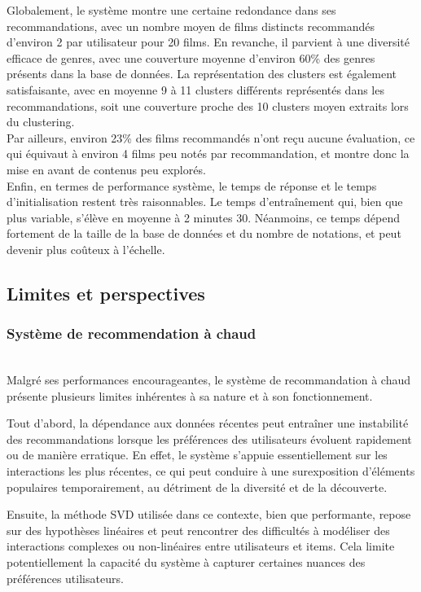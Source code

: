 \documentclass{article}
\begin{document}
Globalement, le système montre une certaine redondance dans ses recommandations, avec un nombre moyen de films distincts recommandés d’environ 2 par utilisateur pour 20 films. En revanche, il parvient à une
diversité efficace de genres, avec une couverture moyenne d’environ 60\% des genres présents dans la base de données.
La représentation des clusters est également satisfaisante, avec en moyenne 9 à 11 clusters différents représentés dans
les recommandations, soit une couverture proche des 10 clusters moyen extraits lors du clustering.\\
Par ailleurs, environ 23\% des films recommandés n’ont reçu aucune évaluation, ce qui équivaut à environ 4 films peu notés
par recommandation, et montre donc la mise en avant de contenus peu explorés.\\
Enfin, en termes de performance système, le temps de réponse et le temps d’initialisation restent très raisonnables. Le temps d’entraînement qui, bien que plus variable, s’élève en moyenne à 2 minutes 30.
 Néanmoins, ce temps dépend fortement de la taille de la base de données et du nombre de notations, et peut devenir plus coûteux à l’échelle.

\subsection{Limites et perspectives}
\subsubsection{Système de recommendation à chaud}
$ $\\
Malgré ses performances encourageantes, le système de recommandation à chaud présente plusieurs limites inhérentes à sa nature et à son fonctionnement.

Tout d’abord, la dépendance aux données récentes peut entraîner une instabilité des recommandations lorsque les préférences des utilisateurs évoluent rapidement ou de manière erratique. En effet, le système s’appuie essentiellement sur les interactions les plus récentes, ce qui peut conduire à une surexposition d’éléments populaires temporairement, au détriment de la diversité et de la découverte.

Ensuite, la méthode SVD utilisée dans ce contexte, bien que performante, repose sur des hypothèses linéaires et peut rencontrer des difficultés à modéliser des interactions complexes ou non-linéaires entre utilisateurs et items. Cela limite potentiellement la capacité du système à capturer certaines nuances des préférences utilisateurs.
\end{document}
